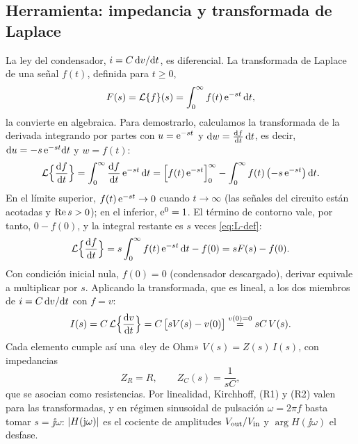 \subsection{Herramienta: impedancia y transformada de Laplace}
La ley del condensador, $i=C\,\mathrm{d} v/\mathrm{d} t$, es diferencial. La transformada de Laplace de una señal
$f(t)$, definida para $t\ge0$,
\begin{equation}\label{eq:L-def}
  F(s)=\mathcal{L}\{f\}(s)=\int_{0}^{\infty}f(t)\,\mathrm{e}^{-st}\,\mathrm{d} t ,
\end{equation}
la convierte en algebraica. Para demostrarlo, calculamos la transformada de la derivada integrando por
partes con $u=\mathrm{e}^{-st}$ y $\mathrm{d} w=\frac{\mathrm{d} f}{\mathrm{d} t}\,\mathrm{d} t$, es decir, $\mathrm{d} u=-s\,\mathrm{e}^{-st}\mathrm{d} t$ y $w=f(t)$:
\begin{equation}\label{eq:L-partes}
  \mathcal{L}\Bigl\{\frac{\mathrm{d} f}{\mathrm{d} t}\Bigr\}=\int_{0}^{\infty}\frac{\mathrm{d} f}{\mathrm{d} t}\,\mathrm{e}^{-st}\,\mathrm{d} t
  =\Bigl[f(t)\,\mathrm{e}^{-st}\Bigr]_{0}^{\infty}-\int_{0}^{\infty}f(t)\,\bigl(-s\,\mathrm{e}^{-st}\bigr)\,\mathrm{d} t .
\end{equation}
En el límite superior, $f(t)\,\mathrm{e}^{-st}\to0$ cuando $t\to\infty$ (las señales del circuito están acotadas y
$\operatorname{Re} s>0$); en el inferior, $\mathrm{e}^{0}=1$. El término de contorno vale, por tanto, $0-f(0)$, y la integral
restante es $s$ veces \eqref{eq:L-def}:
\begin{equation}\label{eq:L-deriv0}
  \mathcal{L}\Bigl\{\frac{\mathrm{d} f}{\mathrm{d} t}\Bigr\}=s\int_{0}^{\infty}f(t)\,\mathrm{e}^{-st}\,\mathrm{d} t-f(0)=sF(s)-f(0) .
\end{equation}
Con condición inicial nula, $f(0)=0$ (condensador descargado), derivar equivale a multiplicar por $s$.
Aplicando la transformada, que es lineal, a los dos miembros de $i=C\,\mathrm{d} v/\mathrm{d} t$ con $f=v$:
\begin{equation}\label{eq:L-deriv}
  I(s)=C\,\mathcal{L}\Bigl\{\frac{\mathrm{d} v}{\mathrm{d} t}\Bigr\}=C\,\bigl[sV(s)-v(0)\bigr]
  \overset{v(0)=0}{=}sC\,V(s) .
\end{equation}
Cada elemento cumple así una «ley de Ohm» $V(s)=Z(s)\,I(s)$, con impedancias
\begin{equation}\label{eq:L-Z}
  Z_R=R,\qquad Z_C(s)=\frac{1}{sC},
\end{equation}
que se asocian como resistencias. Por linealidad, Kirchhoff, (R1) y (R2) valen para las transformadas, y en
régimen sinusoidal de pulsación $\omega=2\pi f$ basta tomar $s=\jj\omega$: $\lvert H(\mathrm{j}\omega)\rvert$ es el cociente de
amplitudes $V_{\mathrm{out}}/V_{\mathrm{in}}$ y $\arg H(\jj\omega)$ el desfase.

